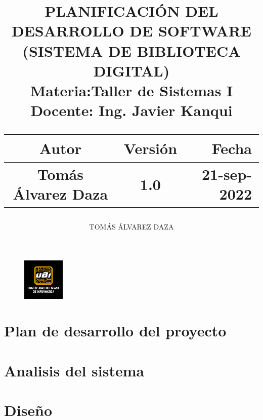 \documentclass[10pt,letterpaper]{report}
\author{TOMÁS ÁLVAREZ DAZA}
\begin{document}
\begin{titlepage}
	\begin{figure}
		\includegraphics[width=2cm]{images/logoUbi2.png}
	\end{figure}
	\title{PLANIFICACIÓN DEL DESARROLLO DE SOFTWARE\\
	(SISTEMA DE BIBLIOTECA DIGITAL)\\
	Materia:Taller de Sistemas I\\ 
	Docente: Ing. Javier Kanqui\\
	\vspace{1cm}

 \begin{tabular}{c|c|r}
	\hline
	Autor & Versión & Fecha \\
	\hline
	Tomás Álvarez Daza & 1.0 & 21-sep-2022 \\
	\hline
	\end{tabular}}
	
\end{titlepage}
\maketitle

\tableofcontents


%
%
\part{Plan de desarrollo del proyecto}


%
%

\part{Analisis del sistema} %
%
%

\part{Diseño}


\end{document}

